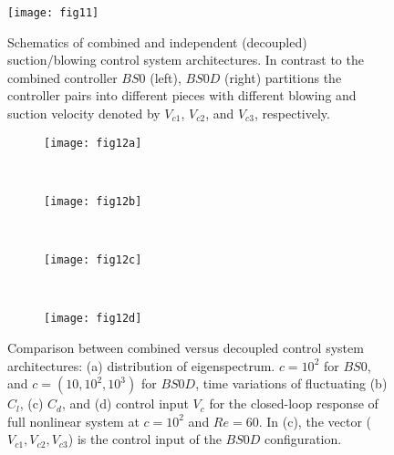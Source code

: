 \documentclass[standard]{jfm}
\begin{document}
\begin{figure}
\centering
  \texttt{[image: fig11]}
    \caption{Schematics of combined and independent (decoupled) suction/blowing 
    control system 
    architectures. In contrast to the 
    combined controller $BS0$ (left), $BS0D$ (right) 
    partitions the controller pairs into different pieces
    with different blowing and suction velocity denoted 
    by $V_{c1}$, $V_{c2}$, and $V_{c3}$, respectively.}
    \label{fig:absf5}
\end{figure}
\begin{figure}
\centering
\begin{minipage}{.4\textwidth}
  \begin{subfigure}[c]{0.47\textwidth}
\centering
  \texttt{[image: fig12a]} 
    \caption{}
    \label{fig:absf5_eig}
    \end{subfigure}  \\
\end{minipage} 
\begin{minipage}{.4\textwidth}
\begin{subfigure}[b]{0.4\textwidth} 
\centering
  \texttt{[image: fig12b]}
	\caption{}
	\label{fig:absf5_cl}
	\end{subfigure}	\\
\begin{subfigure}[b]{0.4\textwidth} 
\centering
  \texttt{[image: fig12c]} 
	\caption{}
	\label{fig:absf5_cd} 
	\end{subfigure}	    \\
\begin{subfigure}[b]{0.4\textwidth} 
\centering
  \texttt{[image: fig12d]} 
	\caption{}
	\label{fig:absf5_Vc}
	\end{subfigure}				
\end{minipage}%
\caption{Comparison between combined versus decoupled control system architectures: 
         (a) distribution of eigenspectrum. $c=10^2$ for $BS0$, and $c=(10,10^2,10^3)$ for $BS0D$,
         time variations of fluctuating (b) $C_l$, (c) $C_d$, and (d) control input $V_c$ 
		 for the closed-loop response of full nonlinear system at $c=10^2$ and $Re=60$.   
		 In (c),  the vector ($V_{c1},V_{c2},V_{c3}$) is the control input of the $BS0D$ configuration. 
          }
\end{figure}
\end{document}
